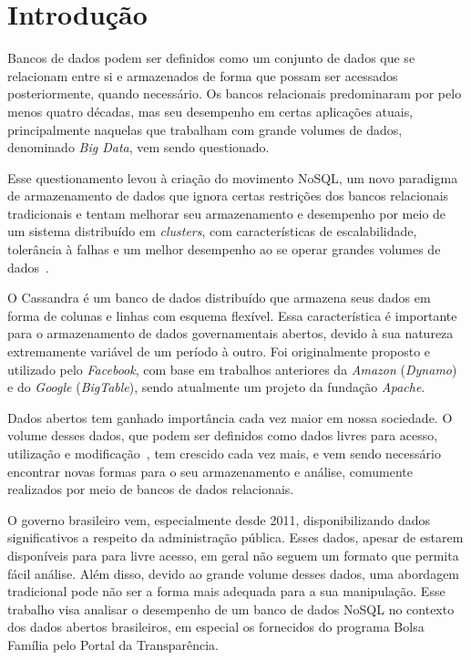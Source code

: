 \chapter{Introdução}

Bancos de dados podem ser definidos como um conjunto de dados que se relacionam entre si e armazenados de forma que possam ser acessados posteriormente, quando necessário.
Os bancos relacionais predominaram por pelo menos quatro décadas, mas seu desempenho em certas aplicações atuais, principalmente naquelas que trabalham com grande volumes de dados, denominado \emph{Big Data}, vem sendo questionado. 

Esse questionamento levou à criação do movimento NoSQL, um novo paradigma de armazenamento de dados que ignora certas restrições dos bancos relacionais tradicionais e tentam melhorar seu armazenamento e desempenho por meio de um sistema distribuído em \emph{clusters}, com características de escalabilidade, tolerância à falhas e um melhor desempenho ao se operar grandes volumes de dados~\cite{pramod}.

O Cassandra é um banco de dados distribuído que armazena seus dados em forma de colunas e linhas com esquema flexível. Essa característica é importante para o armazenamento de dados governamentais abertos, devido à sua natureza extremamente variável de um período à outro. Foi originalmente proposto e utilizado pelo \emph{Facebook}, com base em trabalhos anteriores da \emph{Amazon} (\emph{Dynamo}) e do \emph{Google} (\emph{BigTable}), sendo atualmente um projeto da fundação \emph{Apache}.

Dados abertos tem ganhado importância cada vez maior em nossa sociedade. O volume desses dados, que podem ser definidos como dados livres para acesso, utilização e modificação~\cite{opendefinition}, tem crescido cada vez mais, e vem sendo necessário encontrar novas formas para o seu armazenamento e análise, comumente realizados por meio de bancos de dados relacionais.

O governo brasileiro vem, especialmente desde 2011, disponibilizando dados significativos a respeito da administração pública. Esses dados, apesar de estarem disponíveis para para livre acesso, em geral não seguem um formato que permita fácil análise. Além disso, devido ao grande volume desses dados, uma abordagem tradicional pode não ser a forma mais adequada para a sua manipulação. Esse trabalho visa analisar o desempenho de um banco de dados NoSQL no contexto dos dados abertos brasileiros, em especial os fornecidos do programa Bolsa Família pelo Portal da Transparência.

